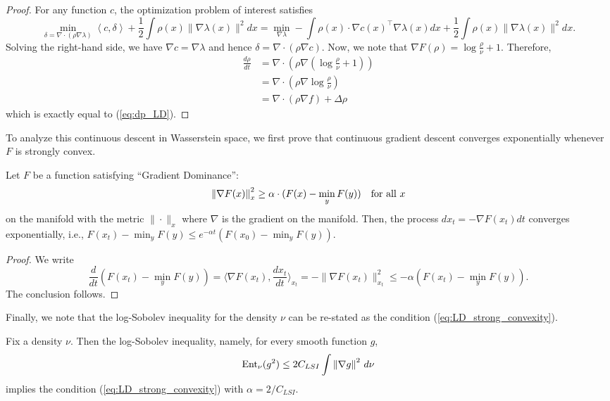 \begin{proof}
For any function $c$, the optimization problem of interest satisfies
\[
\min_{\delta=\nabla\cdot(\rho\nabla\lambda)}\left\langle c,\delta\right\rangle +\frac{1}{2}\int\rho(x)\|\nabla\lambda(x)\|^{2}dx=\min_{\nabla\lambda}-\int\rho(x)\cdot\nabla c(x)^{\top}\nabla\lambda(x)dx+\frac{1}{2}\int\rho(x)\|\nabla\lambda(x)\|^{2}dx.
\]
Solving the right-hand side, we have $\nabla c=\nabla\lambda$ and
hence $\delta=\nabla\cdot(\rho\nabla c)$. Now, we note that $\nabla F(\rho)=\log\frac{\rho}{\nu}+1$.
Therefore, 
\begin{align*}
\frac{d\rho}{dt} & =\nabla\cdot(\rho\nabla(\log\frac{\rho}{\nu}+1))\\
 & =\nabla\cdot(\rho\nabla\log\frac{\rho}{\nu})\\
 & =\nabla\cdot\left(\rho\nabla f\right)+\Delta\rho
\end{align*}
which is exactly equal to (\ref{eq:dp_LD}). 
\end{proof}
To analyze this continuous descent in Wasserstein space, we first
prove that continuous gradient descent converges exponentially whenever
$F$ is strongly convex.
\begin{lem}
\label{lem:grad-dom}Let $F$ be a function satisfying ``Gradient
Dominance'':
\begin{equation}
\left\Vert \nabla F(x)\right\Vert^{2}_{x}\ge\alpha\cdot(F(x)-\min_{y}F(y))\quad\text{for all }x\label{eq:LD_strong_convexity}
\end{equation}
on the manifold with the metric $\|\cdot\|_{x}$ where $\nabla$ is
the gradient on the manifold. Then, the process $dx_{t}=-\nabla F(x_{t})dt$
converges exponentially, i.e., $F(x_{t})-\min_{y}F(y)\le e^{-\alpha t}(F(x_{0})-\min_{y}F(y))$.
\end{lem}

\begin{proof}
We write
\[
\frac{d}{dt}(F(x_{t})-\min_{y}F(y))=\langle\nabla F(x_{t}),\frac{dx_{t}}{dt}\rangle_{x_{t}}=-\|\nabla F(x_{t})\|^{2}_{x_{t}}\leq-\alpha(F(x_{t})-\min_{y}F(y)).
\]
The conclusion follows.
\end{proof}
Finally, we note that the log-Sobolev inequality for the density $\nu$
can be re-stated as the condition (\ref{eq:LD_strong_convexity}).
\begin{lem}
\label{lem:log_sob_LD}Fix a density $\nu$. Then the log-Sobolev
inequality, namely, for every smooth function $g$, 
\[
\mathrm{Ent}_{\nu}(g^{2})\leq2C_{LSI}\int\left\Vert \nabla g\right\Vert^{2}\,d\nu
\]
 implies the condition (\ref{eq:LD_strong_convexity}) with $\alpha=2/C_{LSI}$.
\end{lem}


